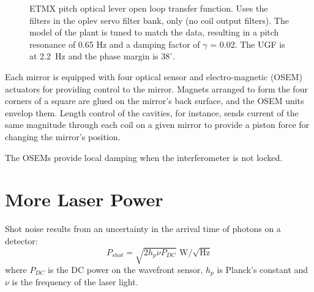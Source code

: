 \begin{figure}
\begin{centering}
\caption[Optical lever open loop transfer function]{ETMX pitch optical
  lever open loop transfer function. Uses the filters in the oplev
  servo filter bank, only (no coil output filters). The model of the
  plant is tuned to match the data, resulting in a pitch resonance of
  0.65 Hz and a damping factor of $\gamma$ = 0.02. The UGF is at
  2.2~Hz and the phase margin is $38^\circ$.}
\label{fig:oplevOLG}
\end{centering}
\end{figure}

Each mirror is equipped with four optical sensor and electro-magnetic
(OSEM) actuators for providing control to the mirror. Magnets arranged
to form the four corners of a square are glued on the mirror's back
surface, and the OSEM units envelop them. Length control of the
cavities, for instance, sends current of the same magnitude through
each coil on a given mirror to provide a piston force for changing the
mirror's position.

The OSEMs provide local damping when the interferometer is not locked.

\section{More Laser Power}
Shot noise results from an uncertainty in the arrival time of photons
on a detector:
\begin{equation}
P_{shot} = \sqrt{2 h_p \nu P_{DC}} \mbox{ W/$\sqrt{\mbox{Hz}}$}
\label{eq:shotnoise}
\end{equation}
where $P_{DC}$ is the DC power on the wavefront sensor, $h_p$ is
Planck's constant and $\nu$ is the frequency of the laser light.


